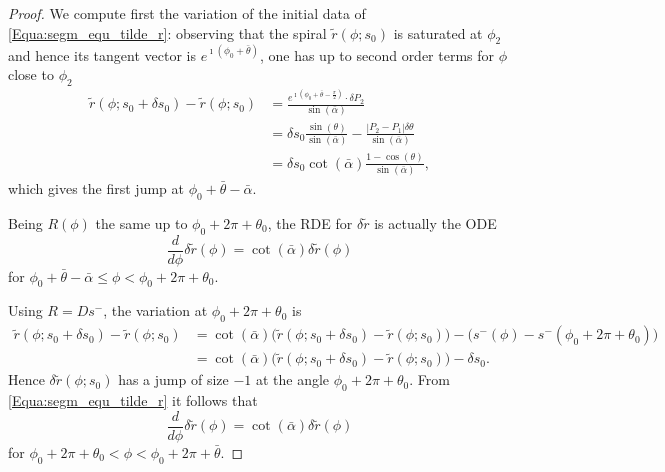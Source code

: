 \documentclass[10pt,a4paper]{amsart}
\renewcommand{\i}{\imath}
\begin{document}
\begin{proof}
%
We compute first the variation of the initial data of \eqref{Equa:segm_equ_tilde_r}: observing that the spiral $\tilde r(\phi;s_0)$ is saturated at $\phi_2$ and hence its tangent vector is $e^{\i (\phi_0 + \bar \theta)}$, one has up to second order terms for $\phi$ close to $\phi_2$ 
\begin{align*}
\tilde r(\phi;s_0 + \delta s_0) - \tilde r(\phi;s_0) &= \frac{e^{\i (\phi_0 + \bar \theta - \frac{\pi}{2})} \cdot \delta P_2}{\sin(\bar \alpha)} \\
&= \delta s_0 \frac{\sin(\theta)}{\sin(\bar \alpha)} - \frac{|P_2 - P_1| \delta \theta}{\sin(\bar \alpha)} \\
&= \delta s_0 \cot(\bar \alpha) \frac{1 - \cos(\theta)}{\sin(\bar \alpha)},
\end{align*}
which gives the first jump at $\phi_0 + \bar \theta - \bar \alpha$.

Being $R(\phi)$ the same up to $\phi_0 + 2\pi + \theta_0$, the RDE for $\delta \tilde r$ is actually the ODE
\begin{equation*}
\frac{d}{d\phi} \delta \tilde r(\phi) = \cot(\bar \alpha) \delta \tilde r(\phi)
\end{equation*}
for $\phi_0 + \bar \theta - \bar\alpha \leq \phi < \phi_0 + 2\pi + \theta_0$.

Using $R = Ds^-$, the variation at $\phi_0 + 2\pi + \theta_0$ is
\begin{align*}
\tilde r(\phi;s_0 + \delta s_0) - \tilde r(\phi;s_0) &= \cot(\bar \alpha) \big( \tilde r(\phi;s_0 + \delta s_0) - \tilde r(\phi;s_0) \big) - \big( s^-(\phi) - s^-(\phi_0 + 2\pi + \theta_0) \big) \\
&= \cot(\bar \alpha) \big( \tilde r(\phi;s_0 + \delta s_0) - \tilde r(\phi;s_0) \big) - \delta s_0.
\end{align*}
Hence $\delta \tilde r(\phi;s_0)$ has a jump of size $-1$ at the angle $\phi_0 + 2\pi + \theta_0$. %
%
From \eqref{Equa:segm_equ_tilde_r} it follows that
\begin{equation*}
\frac{d}{d\phi} \delta \tilde r(\phi) = \cot(\bar \alpha) \delta \tilde r(\phi)
\end{equation*}
for $\phi_0 + 2\pi + \theta_0 < \phi < \phi_0 + 2\pi + \bar \theta$.


\end{proof}
\end{document}
